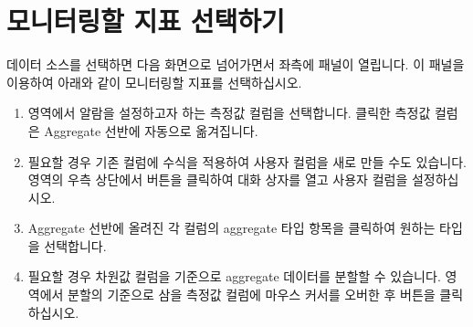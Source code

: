\documentclass[letterpaper,10pt,english]{sphinxmanual}
\begin{document}
\section{모니터링할 지표 선택하기}
\label{\detokenize{anomaly/part02/index:select-columns}}\label{\detokenize{anomaly/part02/index:id3}}
데이터 소스를 선택하면 다음 화면으로 넘어가면서 좌측에  패널이 열립니다. 이 패널을 이용하여 아래와 같이 모니터링할 지표를 선택하십시오.
\begin{enumerate}
\def\theenumi{\arabic{enumi}}
\def\labelenumi{\theenumi .}
\makeatletter\def\p@enumii{\p@enumi \theenumi .}\makeatother
\item {} 
 영역에서 알람을 설정하고자 하는 측정값 컬럼을 선택합니다. 클릭한 측정값 컬럼은 Aggregate 선반에 자동으로 옮겨집니다.
\begin{quote}

\begin{figure}[H]
\centering

\noindent{}
\end{figure}
\end{quote}

\item {} 
필요할 경우 기존 컬럼에 수식을 적용하여 사용자 컬럼을 새로 만들 수도 있습니다.  영역의 우측 상단에서  버튼을 클릭하여 대화 상자를 열고 사용자 컬럼을 설정하십시오.
\begin{quote}

\begin{figure}[H]
\centering

\noindent{}
\end{figure}
\end{quote}

\item {} 
Aggregate 선반에 올려진 각 컬럼의 aggregate 타입 항목을 클릭하여 원하는 타입을 선택합니다.
\begin{quote}

\begin{figure}[H]
\centering

\noindent{}
\end{figure}
\end{quote}

\item {} 
필요할 경우 차원값 컬럼을 기준으로 aggregate 데이터를 분할할 수 있습니다.  영역에서 분할의 기준으로 삼을 측정값 컬럼에 마우스 커서를 오버한 후  버튼을 클릭하십시오.
\begin{quote}


\end{quote}
\end{enumerate}
\end{document}
